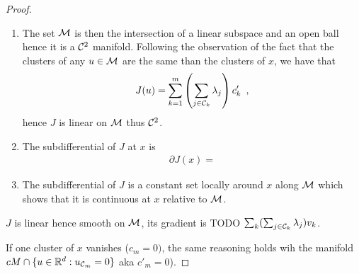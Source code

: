 \begin{proof}
\begin{enumerate}
  \item The set $\mathcal{M}$ is then the intersection of a linear subspace and an open ball hence it is a $\mathcal{C}^2$ manifold. 
  Following the observation of the fact that the clusters of any $u\in\mathcal{M}$ are the same than the clusters of $x$, we have that 
  \begin{align}{}
    J(u) = \sum_{k=1}^m \left( \sum_{j \in \mathcal{C}_k} \lambda_j \right)c_k' \enspace ,
  \end{align}
  hence $J$ is linear on $\mathcal{M}$ thus $\mathcal{C}^2$. 
  \item The subdifferential of $J$ at $x$ is 
  \begin{align}
    \partial J(x) = 
  \end{align}
  \item The subdifferential of $J$ is a constant set locally around $x$ along $\mathcal{M}$ which shows that it is continuous at $x$ relative to $\mathcal{M}$. 
\end{enumerate}






  $J$ is linear hence smooth on $\mathcal{M}$, its gradient is TODO $\sum_k (\sum_{j \in \mathcal{C}_k} \lambda_j) v_k$. 

  If one cluster of $x$ vanishes ($c_m = 0)$, the same reasoning holds wih the manifold $cM \cap \{u \in \mathbb{R}^d: u_{\mathcal{C}_m} = 0\}$ aka $c'_m = 0$).
\end{proof}
